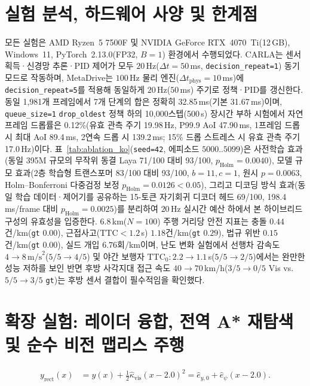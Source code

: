 \documentclass[10pt,twocolumn,a4paper]{article}
\begin{document}
\section{실험 분석, 하드웨어 사양 및 한계점}
모든 실험은 AMD Ryzen~5 7500F 및 NVIDIA GeForce RTX~4070~Ti(12\,GB), Windows~11, PyTorch~2.13.0(FP32, $B=1$) 환경에서 수행되었다. CARLA는 센서 획득·신경망 추론·PID 제어가 모두 $20$\,Hz($\Delta t=50$\,ms, \texttt{decision\_repeat=1}) 동기 모드로 작동하며, MetaDrive는 $100$\,Hz 물리 엔진($\Delta t_{\text{phys}}=10$\,ms)에 \texttt{decision\_repeat=5}를 적용해 동일하게 $20$\,Hz($50$\,ms) 주기로 정책·PID를 갱신한다. 동일 1,981개 프레임에서 7개 단계의 합은 정확히 32.85\,ms(기본 31.67\,ms)이며, \texttt{queue\_size=1} \texttt{drop\_oldest} 정책 하의 10,000스텝(500\,s) 장시간 부하 시험에서 자연 프레임 드롭률은 0.12\%(유효 관측 주기 19.98\,Hz, P99.9 AoI 47.90\,ms, 1프레임 드롭 시 최대 AoI 89.4\,ms, 2연속 드롭 시 139.2\,ms; 15\% 드롭 스트레스 시 유효 관측 주기 17.0\,Hz)이다. 표~\ref{tab:ablation_ko}(\texttt{seed=42}, 에피소드 $5000..5099$)은 사전학습 효과(동일 395M 규모의 무작위 동결 Laya 71/100 대비 93/100, $p_{\text{Holm}}=0.0040$), 모델 규모 효과(2층 학습형 트랜스포머 83/100 대비 93/100, $b=11, c=1$, 원시 $p=0.0063$, Holm--Bonferroni 다중검정 보정 $p_{\text{Holm}}=0.0126 < 0.05$), 그리고 디코딩 방식 효과(동일 학습 데이터·제어기를 공유하는 15-토큰 자기회귀 디코더 헤드 69/100, 198.4\,ms/frame 대비 $p_{\text{Holm}}=0.0025$)를 분리하여 $20$\,Hz 실시간 예산 하에서 본 하이브리드 구성의 유효성을 입증한다. 6.8\,km($N=100$) 주행 거리당 안전 지표는 충돌 $0.44$건/km(\texttt{gt} $0.00$), 근접사고($\text{TTC}<1.2$\,s) $1.18$건/km(\texttt{gt} $0.29$), 법규 위반 $0.15$건/km(\texttt{gt} $0.00$), 실드 개입 $6.76$회/km이며, 난도 변화 실험에서 선행차 감속도 $4\to 8\,\text{m/s}^2$($5/5\to 4/5$) 및 야간 보행자 $\text{TTC}_0: 2.2\to 1.1$\,s($5/5\to 2/5$)에서는 완만한 성능 저하를 보인 반면 후방 사각지대 접근 속도 $40\to 70$\,km/h($3/5\to 0/5$ Vis vs.\ $5/5\to 3/5$ \texttt{gt})는 후방 센서 결합이 필수적임을 확인했다.

\section{확장 실험: 레이더 융합, 전역 A* 재탐색 및 순수 비전 맵리스 주행}
\begin{align}
    y_{\text{rect}}(x) &= y(x) + \frac{1}{2}\hat{\kappa}_{\text{vis}}(x - 2.0)^2 = \hat{e}_{y,0} + \hat{e}_\psi(x - 2.0).
\end{align}
\end{document}
